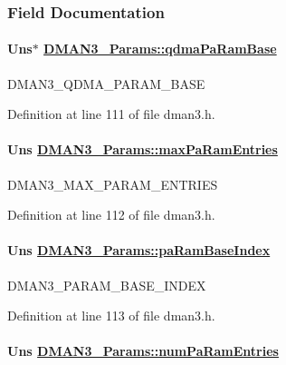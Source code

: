 \subsubsection{Field Documentation}
\hypertarget{struct_d_m_a_n3___params_766e441c25336fb3a36d56c711cb08e4}{
\paragraph[qdmaPaRamBase]{\setlength{\rightskip}{0pt plus 5cm}Uns$\ast$ \hyperlink{struct_d_m_a_n3___params_766e441c25336fb3a36d56c711cb08e4}{DMAN3\_\-Params::qdma\-Pa\-Ram\-Base}}\hfill}
\label{struct_d_m_a_n3___params_766e441c25336fb3a36d56c711cb08e4}


DMAN3\_\-QDMA\_\-PARAM\_\-BASE 

Definition at line 111 of file dman3.h.\hypertarget{struct_d_m_a_n3___params_58339ef320bf8a83a2b995124965405e}{
\paragraph[maxPaRamEntries]{\setlength{\rightskip}{0pt plus 5cm}Uns \hyperlink{struct_d_m_a_n3___params_58339ef320bf8a83a2b995124965405e}{DMAN3\_\-Params::max\-Pa\-Ram\-Entries}}\hfill}
\label{struct_d_m_a_n3___params_58339ef320bf8a83a2b995124965405e}


DMAN3\_\-MAX\_\-PARAM\_\-ENTRIES 

Definition at line 112 of file dman3.h.\hypertarget{struct_d_m_a_n3___params_cd68bdec25ab7f38188f61bf2fda5ceb}{
\paragraph[paRamBaseIndex]{\setlength{\rightskip}{0pt plus 5cm}Uns \hyperlink{struct_d_m_a_n3___params_cd68bdec25ab7f38188f61bf2fda5ceb}{DMAN3\_\-Params::pa\-Ram\-Base\-Index}}\hfill}
\label{struct_d_m_a_n3___params_cd68bdec25ab7f38188f61bf2fda5ceb}


DMAN3\_\-PARAM\_\-BASE\_\-INDEX 

Definition at line 113 of file dman3.h.\hypertarget{struct_d_m_a_n3___params_cde436b501fefb284f4cf43d87dd9e0a}{
\paragraph[numPaRamEntries]{\setlength{\rightskip}{0pt plus 5cm}Uns \hyperlink{struct_d_m_a_n3___params_cde436b501fefb284f4cf43d87dd9e0a}{DMAN3\_\-Params::num\-Pa\-Ram\-Entries}}\hfill}
\label{struct_d_m_a_n3___params_cde436b501fefb284f4cf43d87dd9e0a}


